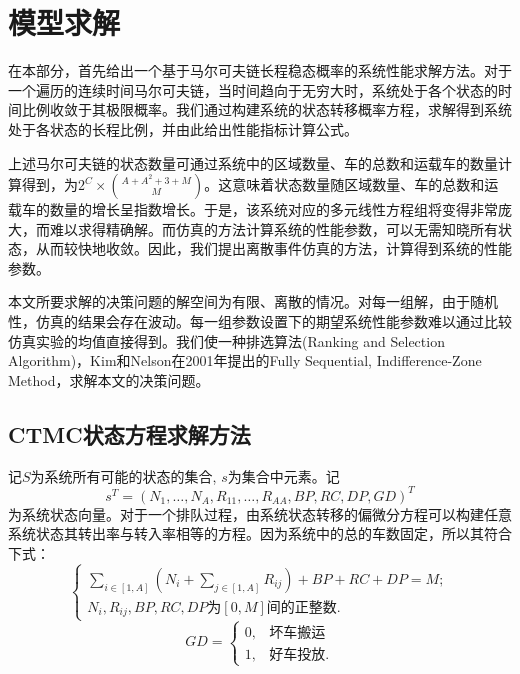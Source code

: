\documentclass{article}
\begin{document}
\section{模型求解}
在本部分，首先给出一个基于马尔可夫链长程稳态概率的系统性能求解方法。对于一个遍历的连续时间马尔可夫链，当时间趋向于无穷大时，系统处于各个状态的时间比例收敛于其极限概率。我们通过构建系统的状态转移概率方程，求解得到系统处于各状态的长程比例，并由此给出性能指标计算公式\cite{SheldonM2011应用随机过程}。

上述马尔可夫链的状态数量可通过系统中的区域数量、车的总数和运载车的数量计算得到，为$ 2^C \times \binom{A+A^2+3+M}{M}$。这意味着状态数量随区域数量、车的总数和运载车的数量的增长呈指数增长。于是，该系统对应的多元线性方程组将变得非常庞大，而难以求得精确解。而仿真的方法计算系统的性能参数，可以无需知晓所有状态，从而较快地收敛。因此，我们提出离散事件仿真的方法，计算得到系统的性能参数。

本文所要求解的决策问题的解空间为有限、离散的情况。对每一组解，由于随机性，仿真的结果会存在波动。每一组参数设置下的期望系统性能参数难以通过比较仿真实验的均值直接得到。我们使一种排选算法(Ranking and Selection Algorithm)，Kim和Nelson在2001年提出的Fully Sequential, Indifference-Zone Method，求解本文的决策问题。

\subsection{CTMC状态方程求解方法}
记$S$为系统所有可能的状态的集合, $s$为集合中元素。记$$s^{T} = (N_1, \dots, N_A, R_{11}, \dots, R_{AA}, BP, RC, DP, GD)^{T}$$为系统状态向量。对于一个排队过程，由系统状态转移的偏微分方程可以构建任意系统状态其转出率与转入率相等的方程。因为系统中的总的车数固定，所以其符合下式：
\begin{equation}
    \left\{
        \begin{array}{lcl}
            \sum \limits _{i \in [1,A]}(N_i+\sum \limits _{j \in [1,A]}R_{ij})+BP+RC+DP = M; \\
            N_i, R_{ij}, BP, RC, DP\mbox{为}[0,M]\mbox{间的正整数}.
        \end{array}
    \right .
\end{equation}
\begin{equation}
    GD = \left\{
        \begin{array}{lcl}
            0, &\mbox{坏车搬运} \\
            1, &\mbox{好车投放}.
        \end{array}
    \right .
\end{equation}
\end{document}
